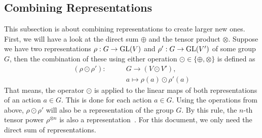 \subsection{Combining Representations}

This subsection is about combining representations to create larger new ones.
First, we will have a look at the direct sum $\oplus$ and the tensor product $\otimes$.
Suppose we have two representations $\rho: G \to \operatorname{GL}(V)$ and $\rho': G \to \operatorname{GL}(V')$ of some group $G$, then the combination of these using either operation $\odot \in \{\oplus, \otimes\}$ is defined as
\begin{subequations}
\begin{align}
    (\rho \odot \rho'): \qquad & G \to (V \odot V'), \\
    & a \mapsto \rho(a) \odot \rho'(a)
\end{align}
\end{subequations}
That means, the operator $\odot$ is applied to the linear maps of both representations of an action $a \in G$.
This is done for each action $a \in G$.
Using the operations from above, $\rho \odot \rho'$ will also be a representation of the group $G$.
By this rule, the $n$-th tensor power $\rho^{\otimes n}$ is also a representation~\cite{fulton2013}.
For this document, we only need the direct sum of representations.
